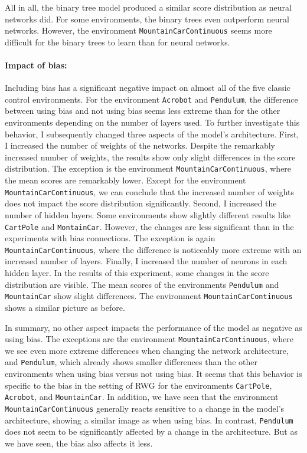 All in all, the binary tree model produced a similar score distribution as neural networks did. For some environments, the binary trees even outperform neural networks. However, the environment \verb|MountainCarContinuous| seems more difficult for the binary trees to learn than for neural networks.

\paragraph*{Impact of bias:} Including bias has a significant negative impact on almost all of the five classic control environments. For the environment \verb|Acrobot| and \verb|Pendulum|, the difference between using bias and not using bias seems less extreme than for the other environments depending on the number of layers used. To further investigate this behavior, I subsequently changed three aspects of the model's architecture. First, I increased the number of weights of the networks. Despite the remarkably increased number of weights, the results show only slight differences in the score distribution. The exception is the environment \verb|MountainCarContinuous|, where the mean scores are remarkably lower. Except for the environment \verb|MountainCarContinuous|, we can conclude that the increased number of weights does not impact the score distribution significantly. Second, I increased the number of hidden layers. Some environments show slightly different results like \verb|CartPole| and \verb|MontainCar|. However, the changes are less significant than in the experiments with bias connections. The exception is again \verb|MountainCarContinuous|, where the difference is noticeably more extreme with an increased number of layers. Finally, I increased the number of neurons in each hidden layer. In the results of this experiment, some changes in the score distribution are visible. The mean scores of the environments \verb|Pendulum| and \verb|MountainCar| show slight differences. The environment \verb|MountainCarContinuous| shows a similar picture as before.

In summary, no other aspect impacts the performance of the model as negative as using bias. The exceptions are the environment \verb|MountainCarContinuous|, where we see even more extreme differences when changing the network architecture, and \verb|Pendulum|, which already shows smaller differences than the other environments when using bias versus not using bias. It seems that this behavior is specific to the bias in the setting of RWG for the environments \verb|CartPole|, \verb|Acrobot|, and \verb|MountainCar|. In addition, we have seen that the environment \verb|MountainCarContinuous| generally reacts sensitive to a change in the model's architecture, showing a similar image as when using bias. In contrast, \verb|Pendulum| does not seem to be significantly affected by a change in the architecture. But as we have seen, the bias also affects it less.

